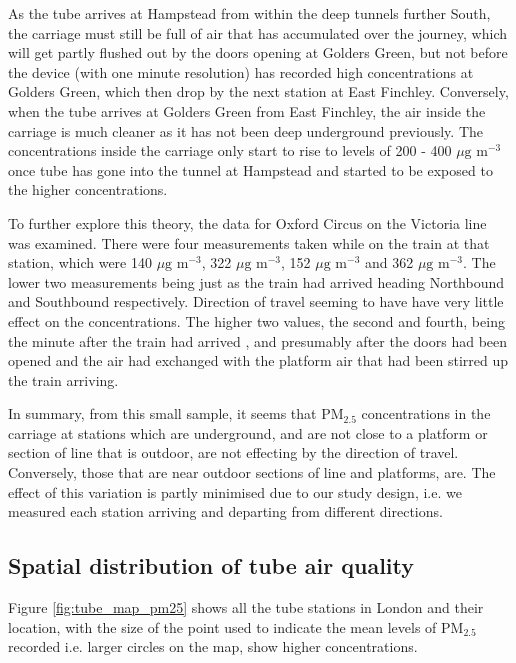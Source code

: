 As the tube arrives at Hampstead from within the deep tunnels further South, the carriage must still be full of air that has accumulated over the journey, which will get partly flushed out by the doors opening at Golders Green, but not before the device (with one minute resolution) has recorded high concentrations at Golders Green, which then drop by the next station at East Finchley. Conversely, when the tube arrives at Golders Green from East Finchley, the air inside the carriage is much cleaner as it has not been deep underground previously. The concentrations inside the carriage only start to rise to levels  of 200 - 400 $\mu \text{g m}^{-3}$ once tube has gone into the tunnel at Hampstead and started to be exposed to the higher concentrations. 

To further explore this theory, the data for Oxford Circus on the Victoria line was examined. There were four measurements taken while on the train at that station, which were 140 $\mu \text{g m}^{-3}$, 322 $\mu \text{g m}^{-3}$, 152 $\mu \text{g m}^{-3}$ and 362 $\mu \text{g m}^{-3}$. The lower two measurements being just as the train had arrived heading Northbound and Southbound respectively. Direction of travel seeming to have have very little effect on the concentrations. The higher two values, the second and fourth, being the minute after the train had arrived , and presumably after the doors had been opened and the air had exchanged with the platform air that had been stirred up the train arriving. 

In summary, from this small sample, it seems that PM$_{2.5}$ concentrations in the carriage at stations which are underground, and are not close to a platform or section of line that is outdoor, are not effecting by the direction of travel. Conversely, those that are near outdoor sections of line and platforms, are. The effect of this variation is partly minimised due to our study design, i.e. we measured each station arriving and departing from different directions.

\subsection{Spatial distribution of tube air quality}
\label{subsec:spatial_distribution_tube_air}

Figure \ref{fig:tube_map_pm25} shows all the tube stations in London and their location, with the size of the point used to indicate the mean levels of PM$_{2.5}$ recorded i.e. larger circles on the map, show higher concentrations.


